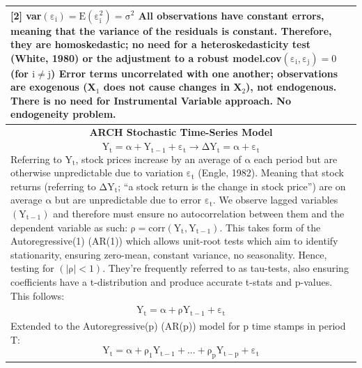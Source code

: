 \documentclass[11pt, english]{article}
\begin{document}
\begin{center}
\begin{longtable}{p{14cm}}
                [2] var$\mathrm{(\varepsilon_i)=E(\varepsilon_i^2)=\sigma^2}$\newline\newline
                All observations have constant errors, meaning that the variance of the residuals is constant. Therefore, they are homoskedastic; no need for a heteroskedasticity test (White, 1980) or the adjustment to a robust model.\newline\newline
                [3] cov$\mathrm{(\varepsilon_i,\varepsilon_j)=0}$ (for $\mathrm{i\neq j}$)\newline\newline
                Error terms uncorrelated with one another; observations are exogenous (X$_1$ does not cause changes in X$_2$), not endogenous. There is no need for Instrumental Variable approach. No endogeneity problem.\\
                \hline
                \multicolumn{1}{c}{\textbf{ARCH Stochastic Time-Series Model}}\\
                \hline
                $$\mathrm{Y_t=\alpha+Y_{t-1}+\varepsilon_t\rightarrow\Delta Y_t=\alpha+\varepsilon_t}$$
		Referring to $\mathrm{Y_t}$, stock prices increase by an average of $\mathrm{\alpha}$ each period but are otherwise unpredictable due to variation $\mathrm{\varepsilon_t}$ (Engle, 1982). Meaning that stock returns (referring to $\mathrm{\Delta Y_t}$; ``a stock return is the change in stock price”) are on average $\mathrm{\alpha}$ but are unpredictable due to error $\mathrm{\varepsilon_t}$.\newline\newline
                We observe lagged variables $\mathrm{(Y_{t-1})}$ and therefore must ensure no autocorrelation between them and the dependent variable as such: $\mathrm{\rho=corr\left(Y_t,Y_{t-1}\right)}$. This takes form of the Autoregressive(1) (AR(1)) which allows unit-root tests which aim to identify stationarity, ensuring zero-mean, constant variance, no seasonality. Hence, testing for $\mathrm{\left(|\rho|<1\right)}$. They’re frequently referred to as tau-tests, also ensuring coefficients have a t-distribution and produce accurate t-stats and p-values. This follows:\\
                $$\mathrm{Y_t=\alpha+\rho Y_{t-1}+\varepsilon_t}$$\\
                Extended to the Autoregressive(p) (AR(p)) model for p time stamps in period T:
                $$\mathrm{Y_t=\alpha+\rho_1Y_{t-1}+...+\rho_pY_{t-p}+\varepsilon_t}$$

\end{longtable}
\end{center}
\end{document}
